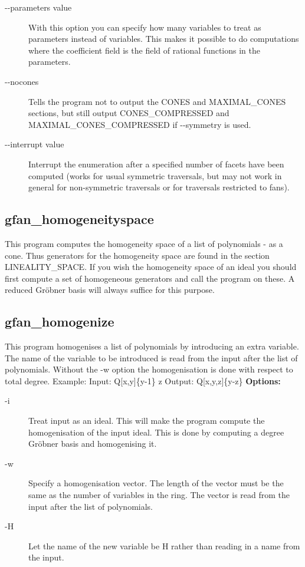 {{{{{{{{{{{{{\begin{description}
\item[-\hspace{0.013cm}-parameters value]With this option you can specify how many variables to treat as parameters instead of variables. This makes it possible to do computations where the coefficient field is the field of rational functions in the parameters.\item[-\hspace{0.013cm}-nocones]Tells the program not to output the CONES and MAXIMAL\_CONES sections, but still output CONES\_COMPRESSED and MAXIMAL\_CONES\_COMPRESSED if -\hspace{0.013cm}-symmetry is used.\item[-\hspace{0.013cm}-interrupt value]Interrupt the enumeration after a specified number of facets have been computed (works for usual symmetric traversals, but may not work in general for non-symmetric traversals or for traversals restricted to fans).\end{description}


{\subsection{gfan\_homogeneityspace}\label{applist:_homogeneityspace}
This program computes the homogeneity space of a list of polynomials - as a cone. Thus generators for the homogeneity space are found in the section LINEALITY\_SPACE. If you wish the homogeneity space of an ideal you should first compute a set of homogeneous generators and call the program on these. A reduced Gr\"obner basis will always suffice for this purpose.


{\subsection{gfan\_homogenize}\label{applist:_homogenize}
This program homogenises a list of polynomials by introducing an extra variable. The name of the variable to be introduced is read from the input after the list of polynomials. Without the -w option the homogenisation is done with respect to total degree.
Example:
Input:
Q[x,y]\{y-1\}
z
Output:
Q[x,y,z]\{y-z\}
\newline
{\bf Options:}
\begin{description}
\item[-i]Treat input as an ideal. This will make the program compute the homogenisation of the input ideal. This is done by computing a degree Gr\"obner basis and homogenising it.\item[-w]Specify a homogenisation vector. The length of the vector must be the same as the number of variables in the ring. The vector is read from the input after the list of polynomials.
\item[-H]Let the name of the new variable be H rather than reading in a name from the input.\end{description}


}}}}}}}}}}}}}}}
